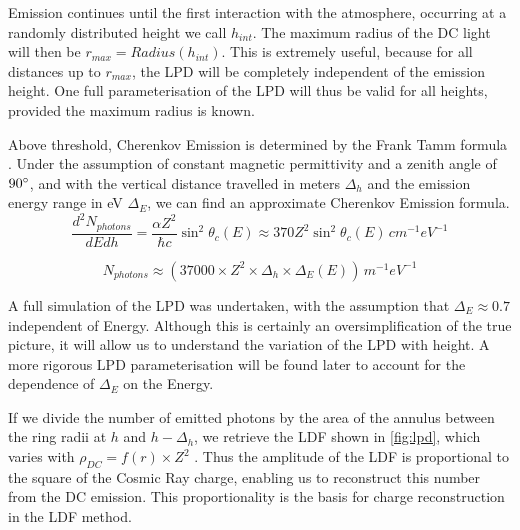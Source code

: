 \documentclass[11pt]{article}
\begin{document}
Emission continues until the first interaction with the atmosphere, occurring at a randomly distributed height we call $h_{int}$. The maximum radius of the DC light will then be $r_{max} = Radius(h_{int})$. This is extremely useful, because for all distances up to $r_{max}$, the LPD will be completely independent of the emission height. One full parameterisation of the LPD will thus be valid for all heights, provided the maximum radius is known.

Above threshold, Cherenkov Emission is determined by the Frank Tamm formula \cite{ppreview}.  Under the assumption of constant magnetic permittivity and a zenith angle of $90\degree$, and with  the vertical distance travelled in meters $\Delta_{h}$ and the emission energy range in eV $\Delta_{E}$, we can find an approximate Cherenkov Emission formula.
\[ \frac{d^{2}N_{photons}}{dEdh} = \frac{\alpha Z^{2}}{\hbar c} \sin^{2} \theta_{c}(E) \approx 370 Z^{2} \sin^{2} \theta_{c}(E)\, cm^{-1}eV^{-1} \]

\[ N_{photons} \approx (37000 \times Z^{2} \times \Delta_{h} \times \Delta_{E}(E))\, m^{-1}eV^{-1}\]
 
A full simulation of the LPD was undertaken, with the assumption that $\Delta_{E} \approx 0.7$ independent of Energy. Although this is certainly an oversimplification of the true picture, it will allow us to understand the variation of the LPD with height. A more rigorous LPD parameterisation will be found later to account for the dependence of $\Delta_{E}$ on the Energy. 

If we divide the number of emitted photons by the area of the annulus between the ring radii at $h$ and $h - \Delta_{h}$, we retrieve the LDF shown in \ref{fig:lpd}, which varies with $ \rho_{DC}  = f(r) \times Z^{2}$ . Thus the amplitude of the LDF is proportional to the square of the Cosmic Ray charge, enabling us to reconstruct this number from the DC emission. This proportionality is the basis for charge reconstruction in the LDF method.
\end{document}

